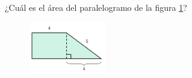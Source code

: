 \question[15]  ¿Cuál es el \'area del paralelogramo de la figura \ref{fig:area_compuesta_02}?
\begin{figure}[H]
    \begin{center}
        \includegraphics[width=0.3\textwidth]{../images/area_compuesta_02.png}
    \end{center}
    \caption{}
    \label{fig:area_compuesta_02}
\end{figure}